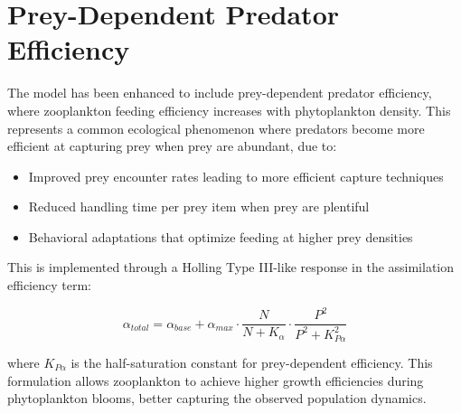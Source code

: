 \section{Prey-Dependent Predator Efficiency}

The model has been enhanced to include prey-dependent predator efficiency, where zooplankton feeding efficiency increases with phytoplankton density. This represents a common ecological phenomenon where predators become more efficient at capturing prey when prey are abundant, due to:

\begin{itemize}
\item Improved prey encounter rates leading to more efficient capture techniques
\item Reduced handling time per prey item when prey are plentiful
\item Behavioral adaptations that optimize feeding at higher prey densities
\end{itemize}

This is implemented through a Holling Type III-like response in the assimilation efficiency term:

\[ \alpha_{total} = \alpha_{base} + \alpha_{max} \cdot \frac{N}{N + K_{\alpha}} \cdot \frac{P^2}{P^2 + K_{P\alpha}^2} \]

where $K_{P\alpha}$ is the half-saturation constant for prey-dependent efficiency. This formulation allows zooplankton to achieve higher growth efficiencies during phytoplankton blooms, better capturing the observed population dynamics.

